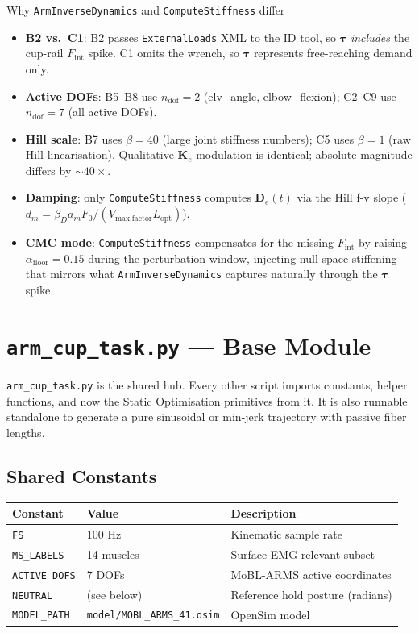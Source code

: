 \documentclass[11pt,a4paper]{article}
\newcommand{\py}[1]{\texttt{\color{PipeBlue}#1}}
\newcommand{\file}[1]{\texttt{\color{PipePurple}#1}}
\newcommand{\btau}{\bm{\tau}}
\begin{document}
\begin{notebox}[PipeOrange]{Why \py{ArmInverseDynamics} and \py{ComputeStiffness} differ}
\begin{itemize}\itemsep2pt
  \item \textbf{B2 vs.\ C1}: B2 passes \texttt{ExternalLoads} XML to the ID
    tool, so $\btau$ \emph{includes} the cup-rail $F_\text{int}$ spike.
    C1 omits the wrench, so $\btau$ represents free-reaching demand only.
  \item \textbf{Active DOFs}: B5--B8 use $n_\text{dof}=2$ (elv\_angle,
    elbow\_flexion); C2--C9 use $n_\text{dof}=7$ (all active DOFs).
  \item \textbf{Hill scale}: B7 uses $\beta=40$ (large joint stiffness numbers);
    C5 uses $\beta=1$ (raw Hill linearisation). Qualitative $\bm{K}_e$
    modulation is identical; absolute magnitude differs by $\sim 40\times$.
  \item \textbf{Damping}: only \py{ComputeStiffness} computes $\bm{D}_e(t)$
    via the Hill f-v slope ($d_m=\beta_D a_m F_0/(V_\text{max,factor}L_\text{opt})$).
  \item \textbf{CMC mode}: \py{ComputeStiffness} compensates for the missing
    $F_\text{int}$ by raising $\alpha_\text{floor}=0.15$ during the
    perturbation window, injecting null-space stiffening that mirrors what
    \py{ArmInverseDynamics} captures naturally through the $\btau$ spike.
\end{itemize}
\end{notebox}


\section{\texttt{arm\_cup\_task.py} — Base Module}

\file{arm\_cup\_task.py} is the shared hub. Every other script imports
constants, helper functions, and now the Static Optimisation primitives
from it.  It is also runnable standalone to generate a pure sinusoidal
or min-jerk trajectory with passive fiber lengths.

\subsection{Shared Constants}

\begin{tabular}{lll}
\toprule
\textbf{Constant} & \textbf{Value} & \textbf{Description} \\
\midrule
\rowcolor{gray!6} \py{FS}          & 100 Hz       & Kinematic sample rate \\
\py{MS\_LABELS}   & 14 muscles    & Surface-EMG relevant subset \\
\rowcolor{gray!6} \py{ACTIVE\_DOFS} & 7 DOFs      & MoBL-ARMS active coordinates \\
\py{NEUTRAL}      & (see below)   & Reference hold posture (radians) \\
\rowcolor{gray!6} \py{MODEL\_PATH} & \texttt{model/MOBL\_ARMS\_41.osim} & OpenSim model \\
\bottomrule
\end{tabular}
\end{document}
